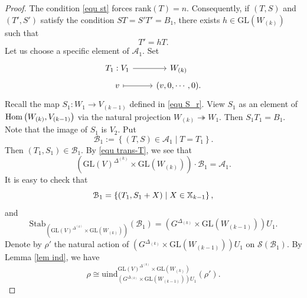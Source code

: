 \documentclass[11pt,reqno]{amsart}
\renewcommand{\1}{{\mathbf{1}}} \newcommand{\sB}{{\mathscr{B}}}
\newcommand{\CA}{{\mathcal {A}}} \newcommand{\CB}{{\mathcal {B}}}
\newcommand{\CS}{{\mathcal {S}}} \newcommand{\CT}{{\mathcal {T}}}
\newcommand{\GL}{{\mathrm{GL}}}\newcommand{\G}{{\mathrm{G}}}
\newcommand{\rank}{{\mathrm{rank}}}
\newcommand{\Stab}{{\mathrm{Stab}}}\newcommand{\Symb}{{\mathrm{Symb}}}
\newcommand{\ra}{\rightarrow} \newcommand{\imp}{\Longrightarrow}
\theoremstyle{plain}
\theoremstyle{definition}
\numberwithin{equation}{section}
\begin{document}
\begin{proof}
The condition \eqref{equ st} forces $\rank(T)=n$. Consequently, if  $(T,S)$ and $(T',S')$ satisfy the condition $ST=S'T'=B_1$,  there exists $h\in\GL(W_{(k)})$ such that 
\begin{equation}\label{equ trans-T} T'=hT. \end{equation}
Let us choose a specific element of $\CA_1$.  Set
$$\begin{tikzcd}[row sep=0.1cm]
	T_{1}: V_{1} & W_{(k)}\\
	v & (v,0,\cdots,0).
	\arrow[ from=1-1, to=1-2]
	\arrow[maps to, from=2-1, to=2-2]
\end{tikzcd}$$
Recall the map 
 $S_1:W_{1}\ra V_{(k-1)}$ defined in  \eqref{equ S_r}. View $S_1$ as an element of ${\mathrm{Hom}}\left(W_{(k)},V_{(k-1)}\right)$ via the natural projection $W_{(k)}\twoheadrightarrow W_{1}$. Then $S_1T_1=B_1$. Note that the image of $S_1$ is $V_{2}$. 
Put $$\CB_1:=\left\{(T,S)\in\CA_1\mid T=T_1\right\}.$$ 
Then $(T_1,S_1)\in\CB_1$. By \eqref{equ trans-T}, we see that
$$\left(\GL(V)^{\Delta^{(k)}}\times\GL(W_{(k)})\right)\cdot\CB_1=\CA_1.$$ It is easy to check that
\begin{equation}\label{equ def-cb}\CB_1=\left\{(T_1,S_1+X)\mid X\in\BX_{k-1} \right\},\end{equation} 
and
$$\Stab_{\left(\GL(V)^{\Delta^{(k)}}\times\GL(W_{(k)})\right)}(\CB_1)=\left(G^{\Delta_{(k)}}\times\GL(W_{(k-1)})\right)U_1.$$ Denote by $\rho'$ the natural action of $\left(G^{\Delta_{(k)}}\times\GL(W_{(k-1)})\right)U_1$ on  $\CS(\CB_1)$. By Lemma \ref{lem ind}, we have  
\begin{equation}\label{equ ind-isom}\rho\cong\mathrm{uind}_{\left(G^{\Delta_{(k)}}\times\GL(W_{(k-1)})\right)U_1}^{\GL(V)^{\Delta^{(k)}}\times\GL(W_{(k)})}(\rho').\end{equation} 


\end{proof}
\end{document}
